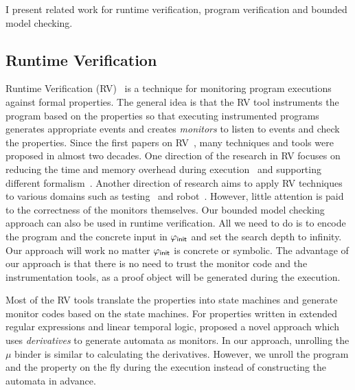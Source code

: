 \documentclass{almostllncs}
\begin{document}
I present related work for runtime verification, program verification and bounded model checking.

\subsection{Runtime Verification}
Runtime Verification (RV)~\cite{RuleBasedMOP,BoddenMOPBOxRV11,BoddenEtAlTraceMatches07,ChenAndRosuTowardsMOP03,DwyerETALOptimizing2010,HavelundRosuRV2001JPAX,HavelundRosuASE2001MonitoringProgramsUsingRewriting,JinEtAlJavaMOPToolPaperICSE12} is a technique for monitoring program executions against formal properties.
The general idea is that the RV tool instruments the program based on the properties so that executing instrumented programs generates appropriate events and creates \emph{monitors} to listen to events and check the properties.
Since the first papers on RV~\cite{HavelundRosuASE2001MonitoringProgramsUsingRewriting,HavelundRosuRV2001JPAX}, many techniques and tools were proposed in almost two decades.
One direction of the research in RV focuses on reducing the time and memory overhead during execution~\cite{JinEtAlGarbageCollectionPLDI2011,PurandareEtAlCompactionISSTA2013,DeckerETALTACAS2016MonitoringWithUnionFind,LuoETAlRVMonitor14,PurandareEtAlStutterEquivalentLoops2010} and supporting different formalism~\cite{MeredithRosuMonitoringStringRewritingASE13,MeredithETALMOPContextFreePatterns08,BarringerETALJLC2010EagleToRuler,HavelundETALFMCAD2017MonitoringWithBDDs}.
Another direction of research aims to apply RV techniques to various domains such as testing~\cite{LegunsenEtAleMOP15} and robot~\cite{huang-erdogan-zhang-moore-luo-sundaresan-rosu-2014-rvtool}.
However, little attention is paid to the correctness of the monitors themselves.
Our bounded model checking approach can also be used in runtime verification.
All we need to do is to encode the program and the concrete input in $\varphi_{\textnormal{\textsf{init}}}$ and set the search depth to infinity.
Our approach will work no matter $\varphi_{\textnormal{\textsf{init}}}$ is concrete or symbolic.
The advantage of our approach is that there is no need to trust the monitor code and the instrumentation tools, as a proof object will be generated during the execution.

Most of the RV tools translate the properties into state machines and generate monitor codes based on the state machines.
For properties written in extended regular expressions and linear temporal logic, \cite{sen-rosu-2003-rv,sen-rosu-agha-2003-asian} proposed a novel approach which uses \emph{derivatives} to generate automata as monitors.
In our approach, unrolling the $\mu$ binder is similar to calculating the derivatives.
However, we unroll the program and the property on the fly during the execution instead of constructing the automata in advance.
\end{document}

